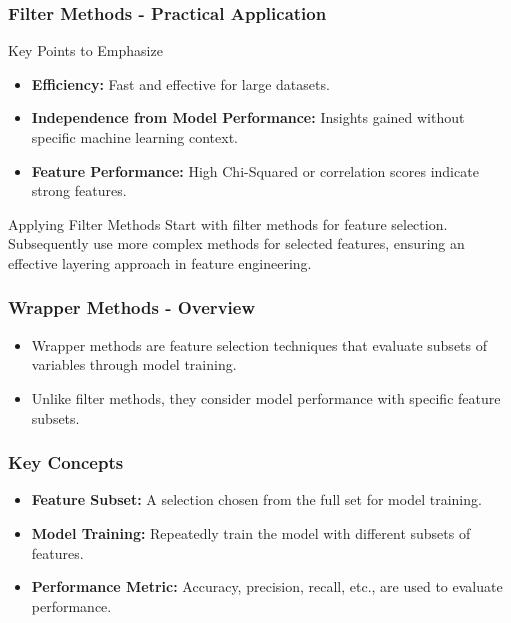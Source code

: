 \documentclass[aspectratio=169]{beamer}
\begin{document}
\begin{frame}[fragile]
    \frametitle{Filter Methods - Practical Application}
    \begin{block}{Key Points to Emphasize}
        \begin{itemize}
            \item \textbf{Efficiency:} Fast and effective for large datasets.
            \item \textbf{Independence from Model Performance:} Insights gained without specific machine learning context.
            \item \textbf{Feature Performance:} High Chi-Squared or correlation scores indicate strong features.
        \end{itemize}
    \end{block}
    
    \begin{block}{Applying Filter Methods}
        Start with filter methods for feature selection. Subsequently use more complex methods for selected features, ensuring an effective layering approach in feature engineering.
    \end{block}
\end{frame}

\begin{frame}[fragile]
    \frametitle{Wrapper Methods - Overview}
    \begin{itemize}
        \item Wrapper methods are feature selection techniques that evaluate subsets of variables through model training.
        \item Unlike filter methods, they consider model performance with specific feature subsets.
    \end{itemize}
\end{frame}

\begin{frame}[fragile]
    \frametitle{Key Concepts}
    \begin{itemize}
        \item \textbf{Feature Subset:} A selection chosen from the full set for model training.
        \item \textbf{Model Training:} Repeatedly train the model with different subsets of features.
        \item \textbf{Performance Metric:} Accuracy, precision, recall, etc., are used to evaluate performance.
    \end{itemize}
\end{frame}
\end{document}

